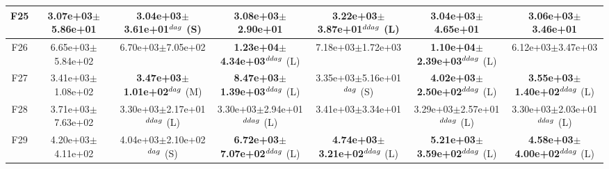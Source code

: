 \begin{table}[!t]
\begin{tabular}{c|cccccc}
F25  & 3.07e+03$\pm$5.86e+01  & 3.04e+03$\pm$3.61e+01$^{\\dag}$ (S)  & 3.08e+03$\pm$2.90e+01   & \textbf{3.22e+03$\pm$3.87e+01}$^{\\ddag}$ (L)  & 3.04e+03$\pm$4.65e+01   & 3.06e+03$\pm$3.46e+01  \\ \hline
F26  & 6.65e+03$\pm$5.84e+02  & 6.70e+03$\pm$7.05e+02   & \textbf{1.23e+04$\pm$4.34e+03}$^{\\ddag}$ (L)  & 7.18e+03$\pm$1.72e+03   & \textbf{1.10e+04$\pm$2.39e+03}$^{\\ddag}$ (L)  & 6.12e+03$\pm$3.47e+03  \\ \hline
F27  & 3.41e+03$\pm$1.08e+02  & \textbf{3.47e+03$\pm$1.01e+02}$^{\\dag}$ (M)  & \textbf{8.47e+03$\pm$1.39e+03}$^{\\ddag}$ (L)  & 3.35e+03$\pm$5.16e+01$^{\\dag}$ (S)  & \textbf{4.02e+03$\pm$2.50e+02}$^{\\ddag}$ (L)  & \textbf{3.55e+03$\pm$1.40e+02}$^{\\ddag}$ (L) \\ \hline
F28  & 3.71e+03$\pm$7.63e+02  & 3.30e+03$\pm$2.17e+01$^{\\ddag}$ (L)  & 3.30e+03$\pm$2.94e+01$^{\\ddag}$ (L)  & 3.41e+03$\pm$3.34e+01   & 3.29e+03$\pm$2.57e+01$^{\\ddag}$ (L)  & 3.30e+03$\pm$2.03e+01$^{\\ddag}$ (L) \\ \hline
F29  & 4.20e+03$\pm$4.11e+02  & 4.04e+03$\pm$2.10e+02$^{\\dag}$ (S)  & \textbf{6.72e+03$\pm$7.07e+02}$^{\\ddag}$ (L)  & \textbf{4.74e+03$\pm$3.21e+02}$^{\\ddag}$ (L)  & \textbf{5.21e+03$\pm$3.59e+02}$^{\\ddag}$ (L)  & \textbf{4.58e+03$\pm$4.00e+02}$^{\\ddag}$ (L) \\ \hline
\end{tabular}
\end{table}
